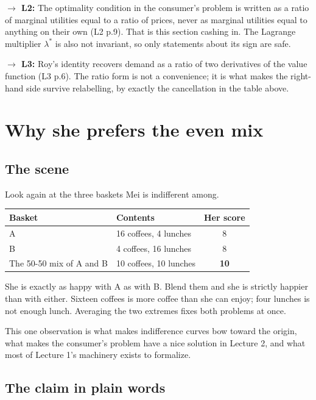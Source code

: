 \documentclass[11pt,letterpaper]{article}
\theoremstyle{definition}
\theoremstyle{plain}
\newcommand{\src}[1]{{\small\textsf{(#1)}}}
\newcommand{\fwd}[1]{\textsf{\textbf{$\rightarrow$ #1:}}}
\begin{document}
\fwd{L2} The optimality condition in the consumer's problem is written as a ratio of marginal
utilities equal to a ratio of prices, never as marginal utilities equal to anything on their own
\src{L2 p.9}. That is this section cashing in. The Lagrange multiplier $\lambda^*$ is also not
invariant, so only statements about its sign are safe.

\fwd{L3} Roy's identity recovers demand as a ratio of two derivatives of the value function
\src{L3 p.6}. The ratio form is not a convenience; it is what makes the right-hand side survive
relabelling, by exactly the cancellation in the table above.

\section{Why she prefers the even mix}
\label{sec:q4}

\subsection{The scene}

Look again at the three baskets Mei is indifferent among.

\begin{center}
\begin{tabular}{@{}llc@{}}
\toprule
\textbf{Basket} & \textbf{Contents} & \textbf{Her score} \\
\midrule
A & 16 coffees, 4 lunches & 8 \\
B & 4 coffees, 16 lunches & 8 \\
\midrule
The 50-50 mix of A and B & 10 coffees, 10 lunches & \textbf{10} \\
\bottomrule
\end{tabular}
\end{center}

She is exactly as happy with A as with B. Blend them and she is strictly happier than with either.
Sixteen coffees is more coffee than she can enjoy; four lunches is not enough lunch. Averaging the
two extremes fixes both problems at once.

This one observation is what makes indifference curves bow toward the origin, what makes the
consumer's problem have a nice solution in Lecture 2, and what most of Lecture 1's machinery exists
to formalize.

\subsection{The claim in plain words}
\end{document}
